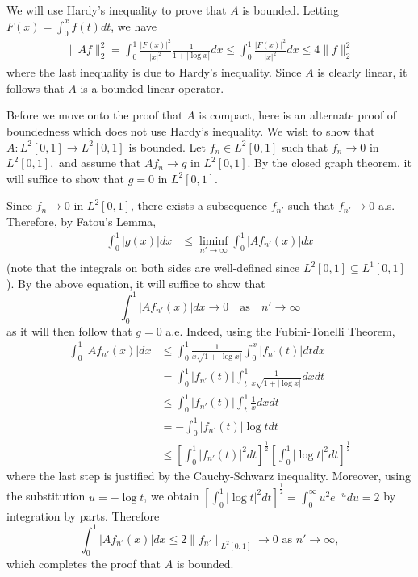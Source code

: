 \documentclass[answers]{exam}
\begin{document}
\begin{questions}
\begin{solution}
  We will use Hardy's inequality to prove that $A$ is bounded. Letting $F(x) = \int_{0}^{x}f(t)dt$, we have
  \begin{align*}
    \| Af \|_{2}^{2} = \int_{0}^{1}\frac{|F(x)|^{2}}{|x|^{2}} \frac{1}{1+|\log x|}dx \leq \int_{0}^{1}\frac{|F(x)|^{2}}{|x|^{2}}dx \leq 4 \| f \|^{2}_{2}
  \end{align*}
  where the last inequality is due to Hardy's inequality. Since $A$ is clearly linear, it follows that $A$ is a bounded linear operator.
  
  Before we move onto the proof that $A$ is compact, here is an alternate proof of boundedness which does not use Hardy's inequality. We wish to show that $A:L^{2}[0,1]\to L^{2}[0,1]$ is
bounded. Let $f_{n}\in L^{2}[0,1]$ such that $f_{n}\to 0$ in $L^{2}[0,1],$ and
assume that $Af_{n}\to g$ in $L^{2}[0,1].$ By the closed graph theorem, it will
suffice to show that $g=0$ in $L^{2}[0,1].$  


Since $f_{n}\to 0$ in $L^{2}[0,1]$, there exists a subsequence $f_{n'}$ such
that $f_{n'}\to 0$ a.s. Therefore, by Fatou's Lemma,
\begin{align*}
  \int_{0}^{1}|g(x)|dx 
  &\leq \liminf_{n'\to\infty}\int_{0}^{1}|Af_{n'}(x)|dx \\
\end{align*}
(note that the integrals on both sides are well-defined since
$L^{2}[0,1]\subseteq L^{1}[0,1]$).
By the above equation, it will suffice to show that
\begin{equation*}
  \int_{0}^{1}|Af_{n'}(x)|dx \to 0
  \quad \text{as} \quad n'\to \infty
\end{equation*}
as it will then follow that $g=0$ a.e. Indeed, using the Fubini-Tonelli Theorem,
\begin{align*}
  \int_{0}^{1}|Af_{n'}(x)|dx
  &\leq \int_{0}^{1}\frac{1}{x \sqrt{1+|\log x|}} \int_{0}^{x}|f_{n'}(t)|dt dx\\ 
  &= \int_{0}^{1}|f_{n'}(t)| \int_{t}^{1}\frac{1}{x \sqrt{1+|\log x|}}  dx dt\\
  &\leq \int_{0}^{1}|f_{n'}(t)| \int_{t}^{1}\frac{1}{x}dxdt\\  
  &= -\int_{0}^{1}|f_{n'}(t)| \log t dt\\
  &\leq \left[ \int_{0}^{1}|f_{n'}(t)|^{2}dt  \right]^{\frac{1}{2}}\left[ \int_{0}^{1} |\log t|^{2} dt \right]^{\frac{1}{2}}
\end{align*}
where the last step is justified by the Cauchy-Schwarz inequality. Moreover,
using the substitution $u = -\log t$, we obtain
$\left[ \int_{0}^{1} |\log t|^{2} dt \right]^{\frac{1}{2}} =
\int_{0}^{\infty}u^{2}e^{-u}du=2$ by integration by parts. Therefore
\begin{equation*}
  \int_{0}^{1}|Af_{n'}(x)|dx \leq  2 \|f_{n'}\|_{L^{2}[0,1]} \to 0 \text{ as }n'\to \infty,
\end{equation*}
which completes the proof that $A$ is bounded.




\end{solution}
\end{questions}
\end{document}
